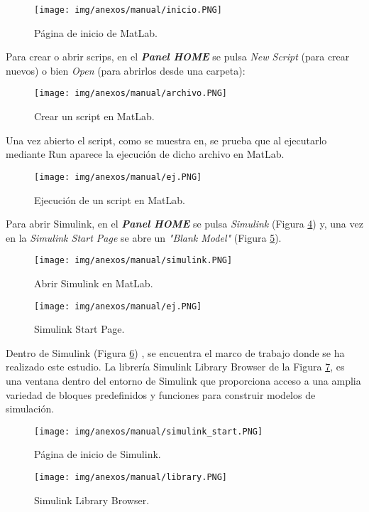 \begin{figure}[htbp]
    \centering
    \texttt{[image: img/anexos/manual/inicio.PNG]}
    \caption{Página de inicio de MatLab.}
    \label{fig:inicio_matlab}
\end{figure}

Para crear o abrir scrips, en el \textbf{\textit{Panel HOME}} se pulsa \textit{New Script} (para crear nuevos) o bien \textit{Open} (para abrirlos desde una carpeta):
\clearpage

\begin{figure}[htbp]
    \centering
    \texttt{[image: img/anexos/manual/archivo.PNG]}
    \caption{Crear un script en MatLab.}
    \label{fig:crear_script}
\end{figure}

Una vez abierto el script, como se muestra en, se prueba que al ejecutarlo mediante Run aparece la ejecución de dicho archivo en MatLab.

\begin{figure}[htbp]
    \centering
    \texttt{[image: img/anexos/manual/ej.PNG]}
    \caption{Ejecución de un script en MatLab.}
    \label{fig:ejecutar_script}
\end{figure}

Para abrir Simulink, en el \textbf{\textit{Panel HOME}} se pulsa \textit{Simulink} (Figura \ref{fig:abrir_simulink}) y, una vez en la \textit{Simulink Start Page} se abre un \textit{"Blank Model"} (Figura \ref{fig:simulink}).

\begin{figure}[htbp]
    \centering
    \texttt{[image: img/anexos/manual/simulink.PNG]}
    \caption{Abrir Simulink en MatLab.}
    \label{fig:abrir_simulink}
\end{figure}
\clearpage
\begin{figure}
    \centering
    \texttt{[image: img/anexos/manual/ej.PNG]}
    \caption{Simulink Start Page.}
    \label{fig:simulink}
\end{figure}

Dentro de Simulink (Figura \ref{fig:inicio_simulink}) , se encuentra el marco de trabajo donde se ha realizado este estudio. La librería Simulink Library Browser de la Figura \ref{fig:library_simulink}, es una ventana dentro del entorno de Simulink que proporciona acceso a una amplia variedad de bloques predefinidos y funciones para construir modelos de simulación. 
\clearpage
\begin{figure}[htbp]
    \centering
    \texttt{[image: img/anexos/manual/simulink\_start.PNG]}
    \caption{Página de inicio de Simulink.}
    \label{fig:inicio_simulink}
\end{figure}
\clearpage
\begin{figure}[htbp]
    \centering
    \texttt{[image: img/anexos/manual/library.PNG]}
    \caption{Simulink Library Browser.}
    \label{fig:library_simulink}
\end{figure}

